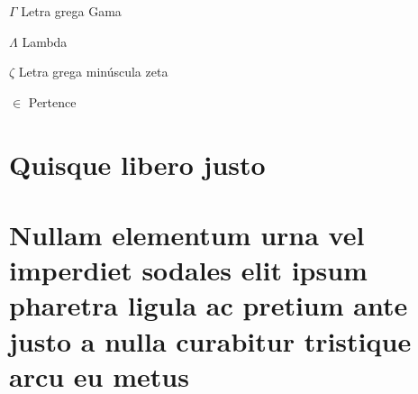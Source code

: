 \documentclass[
12pt,				%
openright,			%
oneside,			%
a4paper,			%
chapter=TITLE,		%
section=TITLE,		%
english,			%
french,				%
spanish,			%
brazil				%
]{abntex2}
\begin{document}
	\begin{simbolos}
		\item[$ \Gamma $] Letra grega Gama
		\item[$ \Lambda $] Lambda
		\item[$ \zeta $] Letra grega minúscula zeta
		\item[$ \in $] Pertence
	\end{simbolos}
	
	\tableofcontents*
	\cleardoublepage
	\textual
	

	
	
	
	
	
	
	\postextual


	

%
%


\begin{apendicesenv}
	
	\partapendices
	
	\chapter{Quisque libero justo}
	
	\lipsum[50]
	
	\chapter{Nullam elementum urna vel imperdiet sodales elit ipsum pharetra ligula
		ac pretium ante justo a nulla curabitur tristique arcu eu metus}
	\lipsum[55-57]
	
\end{apendicesenv}
\end{document}
